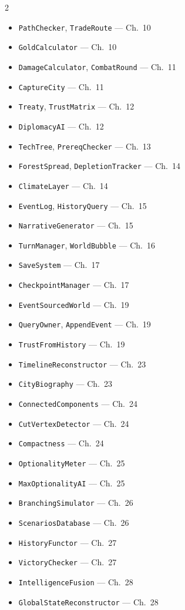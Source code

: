 \documentclass[11pt,a4paper,openany]{book}
\theoremstyle{plain}
\theoremstyle{definition}
\theoremstyle{remark}
\begin{document}
\begin{multicols}{2}
\begin{itemize}[leftmargin=*, itemsep=0pt]
  \item \texttt{PathChecker}, \texttt{TradeRoute} --- Ch.~10
  \item \texttt{GoldCalculator} --- Ch.~10
  \item \texttt{DamageCalculator}, \texttt{CombatRound} --- Ch.~11
  \item \texttt{CaptureCity} --- Ch.~11
  \item \texttt{Treaty}, \texttt{TrustMatrix} --- Ch.~12
  \item \texttt{DiplomacyAI} --- Ch.~12
  \item \texttt{TechTree}, \texttt{PrereqChecker} --- Ch.~13
  \item \texttt{ForestSpread}, \texttt{DepletionTracker} --- Ch.~14
  \item \texttt{ClimateLayer} --- Ch.~14
  \item \texttt{EventLog}, \texttt{HistoryQuery} --- Ch.~15
  \item \texttt{NarrativeGenerator} --- Ch.~15
  \item \texttt{TurnManager}, \texttt{WorldBubble} --- Ch.~16
  \item \texttt{SaveSystem} --- Ch.~17
  \item \texttt{CheckpointManager} --- Ch.~17
  \item \texttt{EventSourcedWorld} --- Ch.~19
  \item \texttt{QueryOwner}, \texttt{AppendEvent} --- Ch.~19
  \item \texttt{TrustFromHistory} --- Ch.~19
  \item \texttt{TimelineReconstructor} --- Ch.~23
  \item \texttt{CityBiography} --- Ch.~23
  \item \texttt{ConnectedComponents} --- Ch.~24
  \item \texttt{CutVertexDetector} --- Ch.~24
  \item \texttt{Compactness} --- Ch.~24
  \item \texttt{OptionalityMeter} --- Ch.~25
  \item \texttt{MaxOptionalityAI} --- Ch.~25
  \item \texttt{BranchingSimulator} --- Ch.~26
  \item \texttt{ScenariosDatabase} --- Ch.~26
  \item \texttt{HistoryFunctor} --- Ch.~27
  \item \texttt{VictoryChecker} --- Ch.~27
  \item \texttt{IntelligenceFusion} --- Ch.~28
  \item \texttt{GlobalStateReconstructor} --- Ch.~28

\end{itemize}
\end{multicols}
\end{document}
